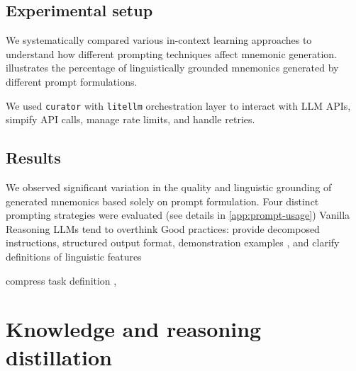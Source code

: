 \documentclass[11pt]{article}
\newcommand{\links}{\textbf{\textsc{Links}}}
\begin{document}
\subsection{Experimental setup}
We systematically compared various in-context learning approaches to understand how different prompting techniques affect mnemonic generation.  illustrates the percentage of linguistically grounded mnemonics generated by different prompt formulations.

We used \verb|curator| \citep{BespokeLabBESPOKE2025} with \verb|litellm| orchestration layer to interact with LLM APIs, simpify API calls, manage rate limits, and handle retries.

\subsection{Results}


We observed significant variation in the quality and linguistic grounding of generated mnemonics based solely on prompt formulation. Four distinct prompting strategies were evaluated (see details in \cref{app:prompt-usage})
Vanilla
Reasoning LLMs tend to overthink \citep{xuChainDraftThinking2025}
Good practices: provide decomposed instructions, structured output format, demonstration examples \citep{MishraREFRAMING2022}, and clarify definitions of linguistic features \citep{yinDidYouRead2023}

compress task definition \citep{yinDidYouRead2023},


\section{Knowledge and reasoning distillation} \label{sec:distillation}

\end{document}

